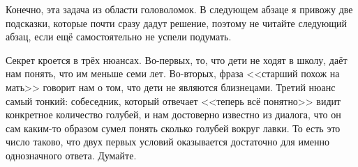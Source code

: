 Конечно, эта задача из области головоломок. В следующем абзаце я привожу две подсказки, которые почти сразу дадут решение, поэтому не читайте следующий абзац, если ещё самостоятельно не успели подумать.

Секрет кроется в трёх нюансах. Во-первых, то, что дети не ходят в школу, даёт нам понять, что им меньше семи лет. Во-вторых, фраза <<старший похож на мать>> говорит нам о том, что дети не являются близнецами. Третий нюанс самый тонкий: собеседник, который отвечает <<теперь всё понятно>> видит конкретное количество голубей, и нам достоверно известно из диалога, что он сам каким-то образом сумел понять сколько голубей вокруг лавки. То есть это число таково, что двух первых условий оказывается достаточно для именно однозначного ответа. Думайте.
